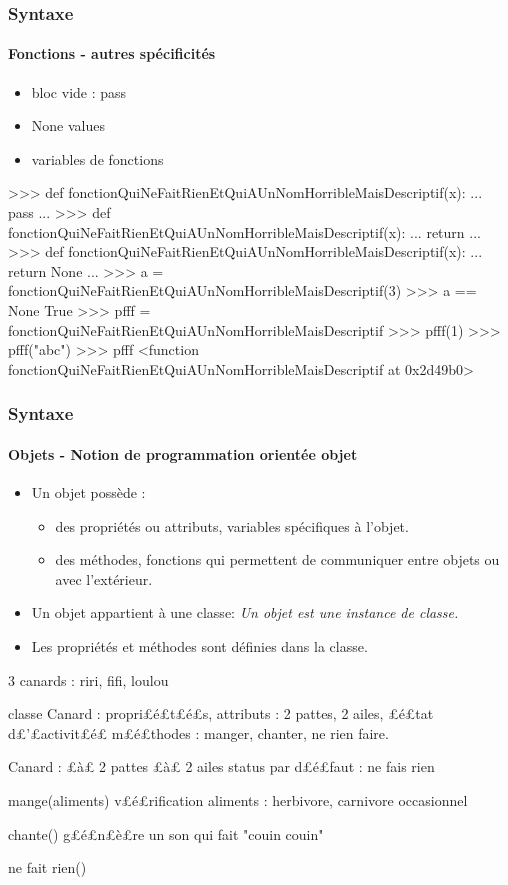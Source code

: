 \begin{frame}[fragile]
\frametitle{Syntaxe}
\framesubtitle{Fonctions - autres spécificités}
\begin{itemize}
\item bloc vide : pass 
\item None values
\item variables de fonctions 
\end{itemize}
\begin{pythonConsole}
>>> def fonctionQuiNeFaitRienEtQuiAUnNomHorribleMaisDescriptif(x): 
...    pass
...
>>> def fonctionQuiNeFaitRienEtQuiAUnNomHorribleMaisDescriptif(x): 
...    return
...
>>> def fonctionQuiNeFaitRienEtQuiAUnNomHorribleMaisDescriptif(x): 
...    return None
...
>>> a = fonctionQuiNeFaitRienEtQuiAUnNomHorribleMaisDescriptif(3)
>>> a == None
True
>>> pfff = fonctionQuiNeFaitRienEtQuiAUnNomHorribleMaisDescriptif
>>> pfff(1)
>>> pfff("abc")
>>> pfff
<function fonctionQuiNeFaitRienEtQuiAUnNomHorribleMaisDescriptif at 0x2d49b0>
\end{pythonConsole}
\end{frame}
\begin{frame}[fragile]
\frametitle{Syntaxe}
\framesubtitle{Objets - Notion de programmation orientée objet}
\begin{itemize}
\item Un objet possède : 
 \begin{itemize}
  \item des propriétés ou attributs, variables spécifiques à l'objet. 
  \item des méthodes, fonctions qui permettent de communiquer entre objets ou avec l'extérieur. 
 \end{itemize}
\item Un objet appartient à une classe: {\em Un objet est une instance de classe. }
\item Les propriétés et méthodes sont définies dans la classe. 
\end{itemize}

\begin{pythonConsole}
3 canards : riri, fifi, loulou

classe Canard : 
propri£é£t£é£s, attributs : 2 pattes, 2 ailes, £é£tat d£'£activit£é£
m£é£thodes : manger, chanter, ne rien faire.  

Canard : 
 £à£ 2 pattes
 £à£ 2 ailes
 status par d£é£faut : ne fais rien
 
 mange(aliments)
  v£é£rification aliments : herbivore, carnivore occasionnel 
 
 chante()
  g£é£n£è£re un son qui fait "couin couin"  

 ne fait rien()
  
\end{pythonConsole}
\end{frame}
